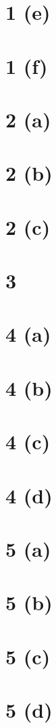 \documentclass[10pt]{article}
\begin{document}
\section*{1 (e)}
\section*{1 (f)}

\section*{2 (a)}
\section*{2 (b)}
\section*{2 (c)}

\section*{3}

\section*{4 (a)}
\section*{4 (b)}
\section*{4 (c)}
\section*{4 (d)}

\section*{5 (a)}
\section*{5 (b)}
\section*{5 (c)}
\section*{5 (d)}
\end{document}
